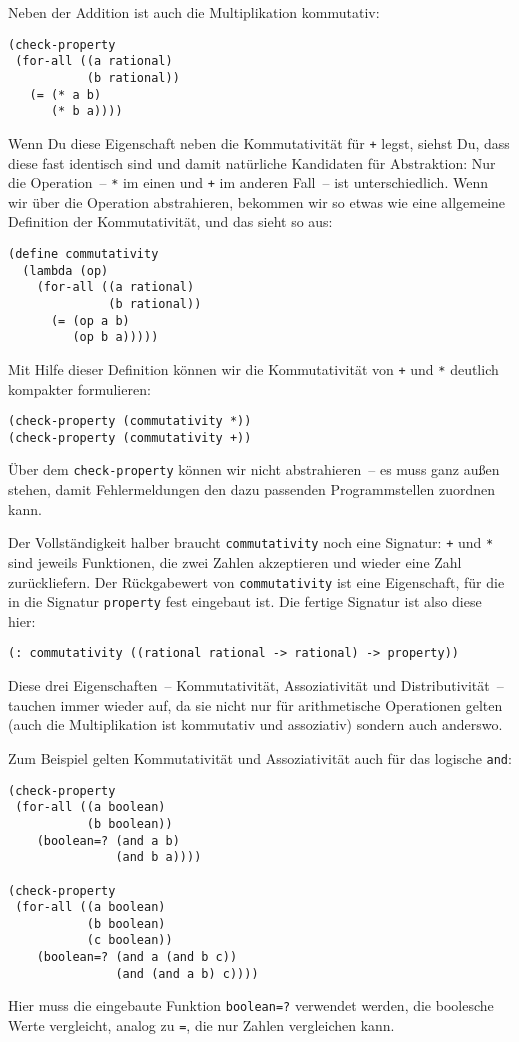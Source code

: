 Neben der Addition ist auch die Multiplikation kommutativ:
%
\begin{lstlisting}
(check-property
 (for-all ((a rational)
           (b rational))
   (= (* a b)
      (* b a))))
\end{lstlisting}
%
Wenn Du diese Eigenschaft neben die Kommutativität für \lstinline{+}
legst, siehst Du, dass diese fast identisch sind und damit natürliche
Kandidaten für Abstraktion: Nur die Operation~-- \lstinline{*} im einen
und \lstinline{+} im anderen Fall~-- ist unterschiedlich.  Wenn wir über
die Operation abstrahieren, bekommen wir so etwas wie eine allgemeine
Definition der Kommutativität, und das sieht so aus:

\begin{lstlisting}
(define commutativity
  (lambda (op)
    (for-all ((a rational)
              (b rational))
      (= (op a b)
         (op b a)))))
\end{lstlisting}
%
Mit Hilfe dieser Definition können wir die Kommutativität von
\lstinline{+} und \lstinline{*} deutlich kompakter formulieren:
%
\begin{lstlisting}
(check-property (commutativity *))
(check-property (commutativity +))
\end{lstlisting}
%
Über dem \lstinline{check-property} können wir nicht abstrahieren~-- es
muss ganz außen stehen, damit \drscheme{} Fehlermeldungen den dazu
passenden Programmstellen zuordnen kann.

Der Vollständigkeit halber braucht \lstinline{commutativity} noch eine
Signatur: \lstinline{+} und \lstinline{*} sind jeweils Funktionen, die zwei
Zahlen akzeptieren und wieder eine Zahl zurückliefern.  Der
Rückgabewert von \lstinline{commutativity} ist eine Eigenschaft, für die
in \drscheme{} die Signatur \lstinline{property} fest eingebaut ist.  Die
fertige Signatur ist also diese hier:
%
\begin{lstlisting}
(: commutativity ((rational rational -> rational) -> property))
\end{lstlisting}

Diese drei Eigenschaften~-- Kommutativität, Assoziativität und
Distributivität~-- tauchen immer wieder auf, da sie nicht nur für
arithmetische Operationen gelten (auch die Multiplikation ist
kommutativ und assoziativ) sondern auch anderswo.  

Zum Beispiel gelten
Kommutativität und Assoziativität auch für das logische \lstinline{and}:
%
\begin{lstlisting}
(check-property
 (for-all ((a boolean)
           (b boolean))
    (boolean=? (and a b)
               (and b a))))

(check-property
 (for-all ((a boolean)
           (b boolean)
           (c boolean))
    (boolean=? (and a (and b c))
               (and (and a b) c))))
\end{lstlisting}
%
Hier muss die eingebaute Funktion \lstinline{boolean=?} verwendet werden,
die boolesche Werte vergleicht, analog zu \lstinline{=}, die nur Zahlen
vergleichen kann.

